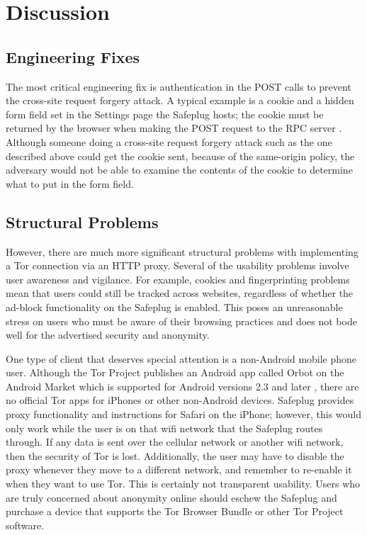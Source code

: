 \documentclass[conference]{IEEEtran}
\begin{document}
\section{Discussion}
\subsection{Engineering Fixes}
The most critical engineering fix is authentication in the POST calls to prevent the cross-site request forgery attack.  A typical example is a cookie and a hidden form field set in the Settings page the Safeplug hosts; the cookie must be returned by the browser when making the POST request to the RPC server \cite{csrfdef}.  Although someone doing a cross-site request forgery attack such as the one described above could get the cookie sent, because of the same-origin policy, the adversary would not be able to examine the contents of the cookie to determine what to put in the form field.

\subsection{Structural Problems}
However, there are much more significant structural problems with implementing a Tor connection via an HTTP proxy.  Several of the usability problems involve user awareness and vigilance.  For example, cookies and fingerprinting problems mean that users could still be tracked across websites, regardless of whether the ad-block functionality on the Safeplug is enabled.  This poses an unreasonable stress on users who must be aware of their browsing practices and does not bode well for the advertised security and anonymity.

One type of client that deserves special attention is a non-Android mobile phone user.  Although the Tor Project publishes an Android app called Orbot on the Android Market \cite{orbot} which is supported for Android versions 2.3 and later \cite{amorbot}, there are no official Tor apps for iPhones or other non-Android devices.  Safeplug provides proxy functionality and instructions for Safari on the iPhone; however, this would only work while the user is on that wifi network that the Safeplug routes through.  If any data is sent over the cellular network or another wifi network, then the security of Tor is lost.  Additionally, the user may have to disable the proxy whenever they move to a different network, and remember to re-enable it when they want to use Tor.  This is certainly not transparent usability.  Users who are truly concerned about anonymity online should eschew the Safeplug and purchase a device that supports the Tor Browser Bundle or other Tor Project software.
\end{document}
